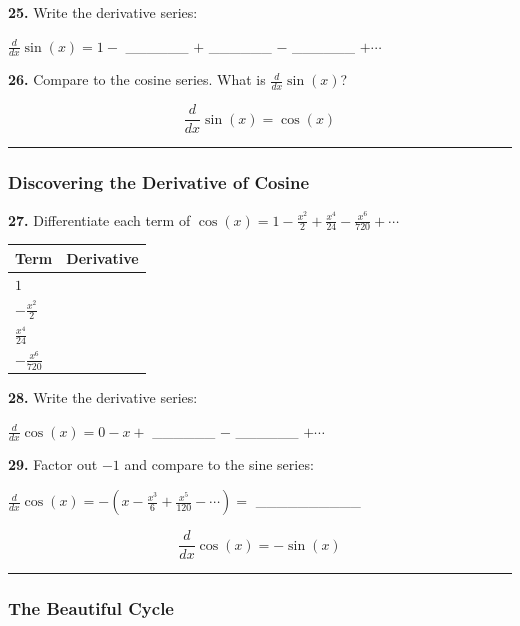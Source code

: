 \documentclass[
  11pt,
]{article}
\begin{document}
\textbf{25.} Write the derivative series:

\(\frac{d}{dx}\sin(x) = 1 -{}\) \_\_\_\_\_\_ \(+\) \_\_\_\_\_\_ \(-\)
\_\_\_\_\_\_ \(+ \cdots\)

\textbf{26.} Compare to the cosine series. What is
\(\frac{d}{dx}\sin(x)\)?

\[\boxed{\frac{d}{dx}\sin(x) = \cos(x)}\]

\begin{center}\rule{0.5\linewidth}{0.5pt}\end{center}

\hypertarget{discovering-the-derivative-of-cosine}{%
\subsubsection{Discovering the Derivative of
Cosine}\label{discovering-the-derivative-of-cosine}}

\textbf{27.} Differentiate each term of
\(\cos(x) = 1 - \frac{x^2}{2} + \frac{x^4}{24} - \frac{x^6}{720} + \cdots\)

\begin{longtable}[]{@{}ll@{}}
\toprule\noalign{}
Term & Derivative \\
\midrule\noalign{}
\endhead
\bottomrule\noalign{}
\endlastfoot
\(1\) & \\
\(-\frac{x^2}{2}\) & \\
\(\frac{x^4}{24}\) & \\
\(-\frac{x^6}{720}\) & \\
\end{longtable}

\textbf{28.} Write the derivative series:

\(\frac{d}{dx}\cos(x) = 0 - x +{}\) \_\_\_\_\_\_ \(-\) \_\_\_\_\_\_
\(+ \cdots\)

\textbf{29.} Factor out \(-1\) and compare to the sine series:

\(\frac{d}{dx}\cos(x) = -\left(x - \frac{x^3}{6} + \frac{x^5}{120} - \cdots\right) ={}\)
\_\_\_\_\_\_\_\_\_\_

\[\boxed{\frac{d}{dx}\cos(x) = -\sin(x)}\]

\begin{center}\rule{0.5\linewidth}{0.5pt}\end{center}

\hypertarget{the-beautiful-cycle}{%
\subsubsection{The Beautiful Cycle}\label{the-beautiful-cycle}}
\end{document}
